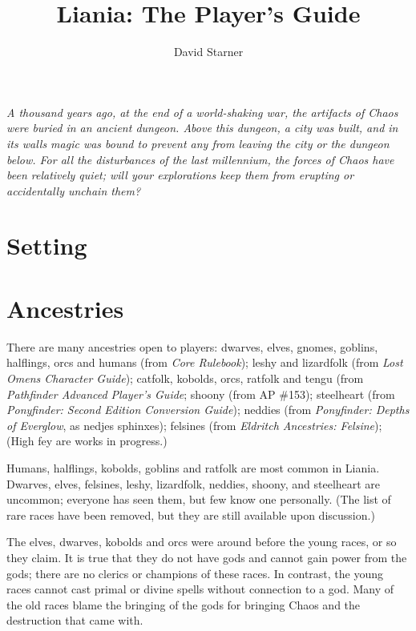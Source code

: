 \documentclass{report}
\title{Liania: The Player's Guide}
\author{David Starner}
\begin{document}
\maketitle
\emph{A thousand years ago, at the end of a world-shaking war, the artifacts of
Chaos were buried in an ancient dungeon. Above this dungeon, a city was built,
and in its walls magic was bound to prevent any from leaving the city or the
dungeon below. For all the disturbances of the last millennium, the forces
of Chaos have been relatively quiet; will your explorations keep them from
erupting or accidentally unchain them?}

\chapter{Setting}


\chapter{Ancestries}

There are many ancestries open to players: dwarves, elves, gnomes, goblins,
halflings, orcs and humans (from \emph{Core Rulebook}); leshy and lizard\-folk (from
\emph{Lost Omens Character Guide}); catfolk, kobolds, orcs, ratfolk and tengu (from
\emph{Pathfinder Advanced Player's Guide}; shoony (from AP \#153);
steel\-heart (from \emph{Pony\-finder: Second Edition Con\-version Guide}); neddies (from \emph{Pony\-finder:
Depths of Everglow}, as nedjes sphinxes); felsines (from \emph{Eldritch Ancestries: Felsine});
(High fey are works in progress.)

Humans, halflings, kobolds, goblins and rat\-folk are most common in Liania.
Dwarves, elves, felsines, leshy, lizardfolk, neddies, shoony, and steelheart are
uncommon; everyone has seen them, but few know one personally. (The list of
rare races have been removed, but they are still available upon discussion.)

The elves, dwarves, kobolds and orcs were around before the young races, or so they claim.
It is true that they do not have gods and cannot gain power from the gods; there
are no clerics or champions of these races. In contrast, the young races cannot
cast primal or divine spells without connection to a god. Many of the old races
blame the bringing of the gods for bringing Chaos and the destruction that came with.
\end{document}
